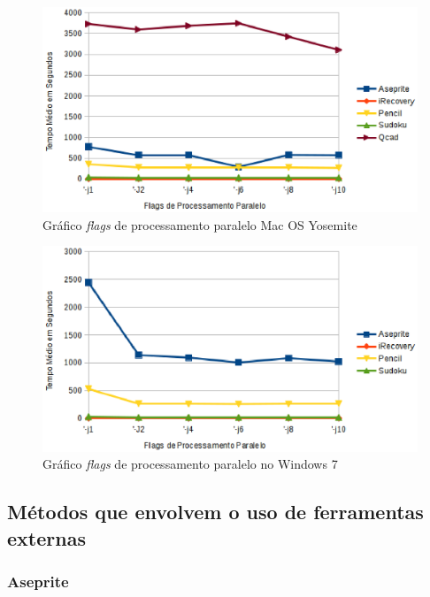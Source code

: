 \begin{apendicesenv}
        \begin{figure}[!h]
            \centering
                \includegraphics{figuras/graficos/mac_os_processamento_paralelo.eps}
            \caption{Gráfico \textit{flags} de processamento paralelo Mac OS Yosemite}
            \label{flags_de_processamento_paralelo_mac_os}
        \end{figure}

        \begin{figure}[!h]
            \centering
                \includegraphics{figuras/graficos/windows_processamento_paralelo.eps}
            \caption{Gráfico \textit{flags} de processamento paralelo no Windows 7}
            \label{flags_de_processamento_paralelo_windows}
        \end{figure}


\clearpage
\subsection{Métodos que envolvem o uso de ferramentas externas}
\label{uso_de_ferramentas_externas_apendice}

\subsubsection*{Aseprite}


\end{apendicesenv}
